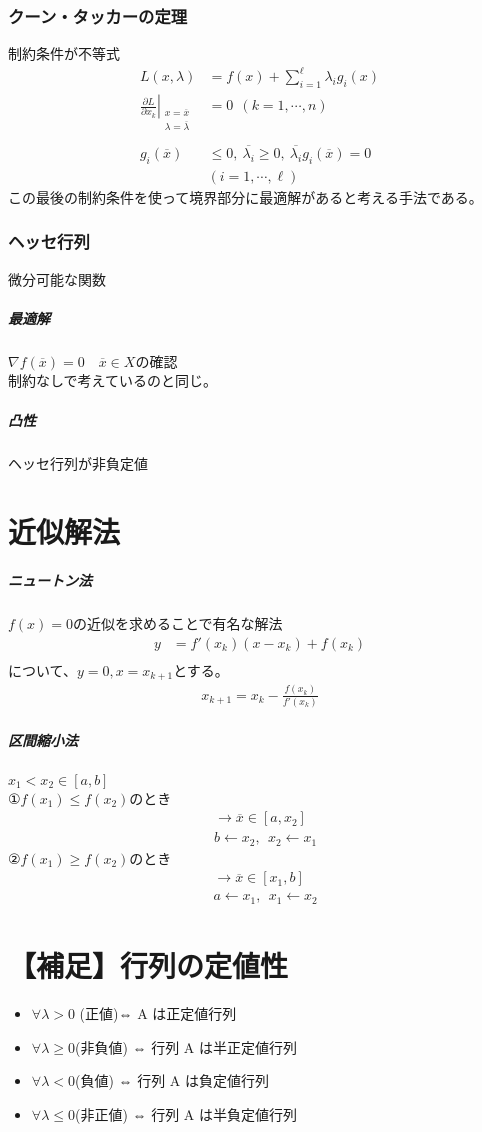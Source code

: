 \documentclass[twocolumn]{ltjsarticle}
\begin{document}
\subsubsection{クーン・タッカーの定理}\rightarrow 制約条件が不等式
\begin{align*}
    L(x,\lambda)&=f(x)+\sum_{i=1}^{\ell}\lambda_ig_i(x)\\
    \left. \frac{\partial L}{\partial x_k} \right|_{
        \begin{matrix}
            x=\overline{x}\\
            \lambda=\overline{\lambda}
        \end{matrix}
        }
    &=0\ \ (k=1,\cdots,n)\\\\
    g_i(\overline{x})&\leq0,\ \overline{\lambda_i}\geq0,\ 
    \overline{\lambda_i}g_i(\overline{x})=0\ \ \\
    &(i=1,\cdots,\ell)
\end{align*}
この最後の制約条件を使って境界部分に最適解があると考える手法である。
\subsubsection{ヘッセ行列}\rightarrow 微分可能な関数
\subparagraph{最適解}
$\nabla f(\overline{x})=0$\ \rightarrow \ $\overline{x}\in X$の確認
\\制約なしで考えているのと同じ。
\subparagraph{凸性}
ヘッセ行列が非負定値

\section{近似解法}
\subparagraph{ニュートン法}
$f(x)=0$の近似を求めることで有名な解法
\begin{align*}
    y&=f'(x_k)(x-x_k)+f(x_k)\\
\end{align*}
について、$y=0,x=x_{k+1}$とする。
\begin{align*}
    x_{k+1}=x_k-\frac{f(x_k)}{f'(x_k)}
\end{align*}
\subparagraph{区間縮小法}
$x_1<x_2\in[a,b]$\\
①$f(x_1)\leq f(x_2)$のとき
\begin{align*}
    &\rightarrow \overline{x}\in[a,x_2]\\
    &b\leftarrow x_2,\ \ x_2\leftarrow x_1
\end{align*}
②$f(x_1)\geq f(x_2)$のとき
\begin{align*}
    &\rightarrow \overline{x}\in[x_1,b]\\
    &a\leftarrow x_1,\ \ x_1\leftarrow x_2
\end{align*}

\section{【補足】行列の定値性}
\begin{itemize}
    \item $\forall \lambda  > 0$ (正値)⇔ A は正定値行列
    \item $\forall \lambda  \geq 0$(非負値) ⇔ 行列 A は半正定値行列
    \item $\forall \lambda < 0$(負値) ⇔ 行列 A は負定値行列
    \item $\forall \lambda \leq 0$(非正値) ⇔ 行列 A は半負定値行列
\end{itemize}
\end{document}
